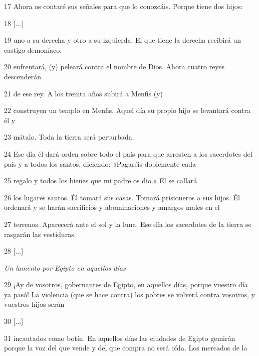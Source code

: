 \par 17 Ahora os contaré sus señales para que lo conozcáis. Porque tiene dos hijos:

\par 18 [...]

\par 19 uno a su derecha y otro a su izquierda. El que tiene la derecha recibirá un castigo demoníaco.

\par 20 enfrentará, (y) peleará contra el nombre de Dios. Ahora cuatro reyes descenderán

\par 21 de ese rey. A los treinta años subirá a Menfis (y)

\par 22 construyen un templo en Menfis. Aquel día su propio hijo se levantará contra él y

\par 23 mátalo. Toda la tierra será perturbada.

\par 24 Ese día él dará orden sobre todo el país para que arresten a los sacerdotes del país y a todos los santos, diciendo: «Pagaréis doblemente cada

\par 25 regalo y todos los bienes que mi padre os dio.» El se callará

\par 26 los lugares santos. Él tomará sus casas. Tomará prisioneros a sus hijos. Él ordenará y se harán sacrificios y abominaciones y amargos males en el

\par 27 terrenos. Aparecerá ante el sol y la luna. Ese día los sacerdotes de la tierra se rasgarán las vestiduras.

\par 28 [...]

\par \textit{Un lamento por Egipto en aquellos días}

\par 29 ¡Ay de vosotros, gobernantes de Egipto, en aquellos días, porque vuestro día ya pasó! La violencia (que se hace contra) los pobres se volverá contra vosotros, y vuestros hijos serán

\par 30 [...]

\par 31 incautados como botín. En aquellos días las ciudades de Egipto gemirán porque la voz del que vende y del que compra no será oída. Los mercados de la

